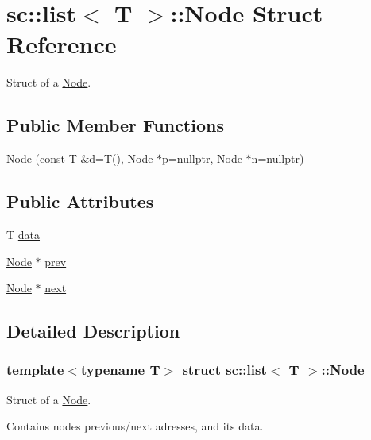 \hypertarget{structsc_1_1list_1_1_node}{}\section{sc\+:\+:list$<$ T $>$\+:\+:Node Struct Reference}
\label{structsc_1_1list_1_1_node}


Struct of a \hyperlink{structsc_1_1list_1_1_node}{Node}.  


\subsection*{Public Member Functions}
\begin{DoxyCompactItemize}
\item 
\hyperlink{structsc_1_1list_1_1_node_a43b4121e99bd75c88f2925e6487976af}{Node} (const T \&d=T(), \hyperlink{structsc_1_1list_1_1_node}{Node} $\ast$p=nullptr, \hyperlink{structsc_1_1list_1_1_node}{Node} $\ast$n=nullptr)
\end{DoxyCompactItemize}
\subsection*{Public Attributes}
\begin{DoxyCompactItemize}
\item 
T \hyperlink{structsc_1_1list_1_1_node_a77a35a24ed39572cf696d53be6c5ec90}{data}
\item 
\hyperlink{structsc_1_1list_1_1_node}{Node} $\ast$ \hyperlink{structsc_1_1list_1_1_node_a034da1a87dbe111bd4f72fe63838a31b}{prev}
\item 
\hyperlink{structsc_1_1list_1_1_node}{Node} $\ast$ \hyperlink{structsc_1_1list_1_1_node_aaa401ec4c4ca551180062524f1952230}{next}
\end{DoxyCompactItemize}


\subsection{Detailed Description}
\subsubsection*{template$<$typename T$>$\newline
struct sc\+::list$<$ T $>$\+::\+Node}

Struct of a \hyperlink{structsc_1_1list_1_1_node}{Node}. 

Contains nodes previous/next adresses, and it\textquotesingle{}s data. 

